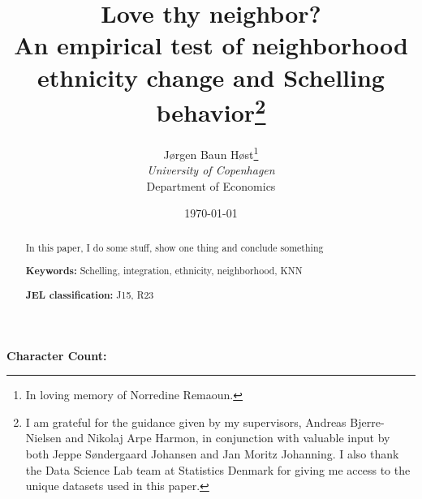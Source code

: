 \documentclass[11pt,a4paper]{article}
\author {
        Jørgen Baun Høst\thanks{In loving memory of Norredine Remaoun.}\\
        \small \textit{University of Copenhagen} \\
        \small Department of Economics}
\title{Love thy neighbor?\\
\vspace{0.35cm}
\large An empirical test of neighborhood ethnicity change and Schelling behavior\thanks{I am grateful for the guidance given by my supervisors, Andreas Bjerre-Nielsen and Nikolaj Arpe Harmon, in conjunction with valuable input by both Jeppe Søndergaard Johansen and Jan Moritz Johanning. I also thank the Data Science Lab team at Statistics Denmark for giving me access to the unique datasets used in this paper.}
\vspace{0.35cm}
}
\date{\today}
\begin{document}
\begin{spacing}{1}
\maketitle    
\end{spacing}

\vspace*{-1cm}
\begin{abstract}
\noindent
In this paper, I do some stuff, show one thing and conclude something

\medskip
\noindent
\textbf{Keywords:} Schelling, integration, ethnicity, neighborhood, KNN

\medskip
\noindent
\textbf{JEL classification:} J15, R23 
\end{abstract}


\newpage 
\begingroup
\begin{spacing}{1.25}
\tableofcontents
\end{spacing}
\endgroup


\vspace{1.5cm}
\begin{center}
\textbf{Character Count:} 
\end{center}

\pagebreak


\pagebreak

 

\pagebreak

 

\pagebreak

 

\pagebreak

 

\pagebreak



\pagebreak

    \printbibliography


\pagebreak


\appendix
\appendixpage


\end{document}
